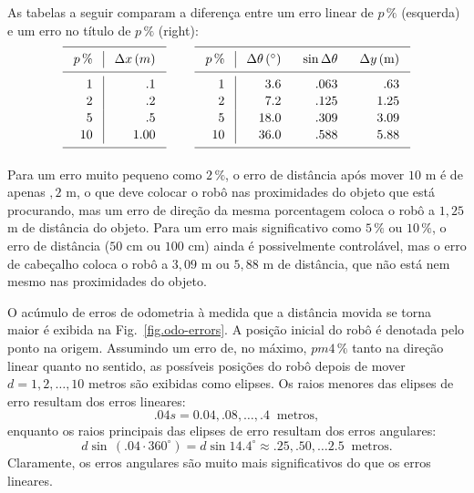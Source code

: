 {As tabelas a seguir comparam a diferença entre um erro linear de $p\,\%$ (esquerda) e um erro no título de $p\,\%$ (right):
\begin{displaymath}
\setlength{\arraycolsep}{2ex}
\renewcommand{\arraystretch}{1.1}
\begin{array}{r|r}
\hline\noalign{\smallskip}
\multicolumn{1}{c|}{p\,\%} & \multicolumn{1}{c}{\Delta x \,(m)}\\
\noalign{\smallskip}\hline\noalign{\smallskip}
1 & .1 \\
2 & .2 \\
5 & .5 \\
10 & 1.00\\
\noalign{\smallskip}\hline\noalign{\smallskip}
\end{array}
\;\;\;\;\;\;\;\;
\begin{array}{r|rrr}
\hline\noalign{\smallskip}
\multicolumn{1}{c|}{p\,\%} & \multicolumn{1}{c}{\Delta \theta\,({}^\circ)} & \multicolumn{1}{c}{\sin\Delta\theta} & \multicolumn{1}{c}{\Delta y \,(\textrm{m})}\\
\noalign{\smallskip}\hline\noalign{\smallskip}
1 &  3.6 & .063 & .63\\
2 &  7.2 & .125 & 1.25\\
5 &  18.0 & .309 & 3.09\\
10 & 36.0 & .588 & 5.88\\
\noalign{\smallskip}\hline\noalign{\smallskip}
\end{array}
\end{displaymath}

Para um erro muito pequeno como $2\,\%$, o erro de distância após mover $10$ m é de apenas $,2$ m, o que deve colocar o robô nas proximidades do objeto que está procurando, mas um erro de direção da mesma porcentagem coloca o robô a $1,25$ m de distância do objeto. Para um erro mais significativo como $5\,\%$ ou $10\,\%$, o erro de distância ($50$ cm ou $100$ cm) ainda é possivelmente controlável, mas o erro de cabeçalho coloca o robô a $3,09$ m ou $5,88$ m de distância, que não está nem mesmo nas proximidades do objeto.

O acúmulo de erros de odometria à medida que a distância movida se torna maior é exibida na Fig.~\ref{fig.odo-errors}. A posição inicial do robô é denotada pelo ponto na origem.  Assumindo um erro de, no máximo, $pm 4\,\%$ tanto na direção linear quanto no sentido, as possíveis posições do robô depois de mover $d=1,2,\ldots,10$ metros são exibidas como elipses. Os raios menores das elipses de erro resultam dos erros lineares:
\[.04s = 0.04, .08, \ldots, .4 \;\;\textrm{metros},
\]
enquanto os raios principais das elipses de erro resultam dos erros angulares:
\[
d\sin \,(.04\cdot 360^\circ)=d \sin 14.4^\circ \approx{} .25, .50, \ldots 2.5\;\;\textrm{metros}.
\]
Claramente, os erros angulares são muito mais significativos do que os erros lineares.

}
